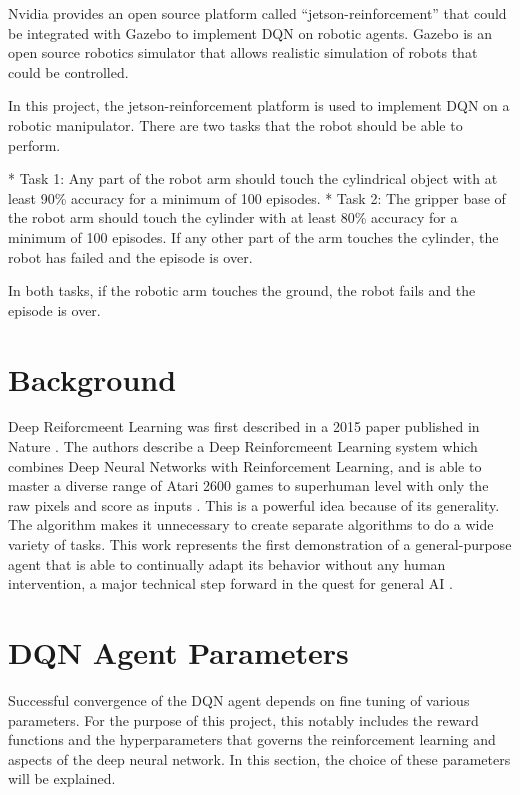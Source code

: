 \documentclass[10pt,journal,compsoc]{IEEEtran}
\begin{document}
Nvidia provides an open source platform called “jetson-reinforcement” that could be integrated with Gazebo to implement DQN on robotic agents. Gazebo is an open source robotics simulator that allows realistic simulation of robots that could be controlled. 

In this project, the jetson-reinforcement platform is used to implement DQN on a robotic manipulator. There are two tasks that the robot should be able to perform. 

* Task 1: Any part of the robot arm should touch the cylindrical object with at least 90\% accuracy for a minimum of 100 episodes.
* Task 2: The gripper base of the robot arm should touch the cylinder with at least 80\% accuracy for a minimum of 100 episodes. If any other part of the arm touches the cylinder, the robot has failed and the episode is over.

In both tasks, if the robotic arm touches the ground, the robot fails and the episode is over.




\section{Background}

Deep Reiforcmeent Learning was first described in a 2015 paper published in Nature \cite{Naturepaper}. The authors describe  a Deep Reinforcmeent Learning system which combines Deep Neural Networks with Reinforcement Learning,  and is able to master a diverse range of Atari 2600 games to superhuman level with only the raw pixels and score as inputs \cite{Deepmind}. This is a powerful idea because of its generality. The algorithm makes it unnecessary to create separate algorithms to do a wide variety of tasks. This work represents the first demonstration of a general-purpose agent that is able to continually adapt its behavior without any human intervention, a major technical step forward in the quest for general AI \cite{Deepmind}.



\section{DQN Agent Parameters}
Successful convergence of the DQN agent depends on fine tuning of various parameters. For the purpose of this project, this notably includes the reward functions and the hyperparameters that governs the reinforcement learning and aspects of the deep neural network. In this section, the choice of these parameters will be explained. 
\end{document}
